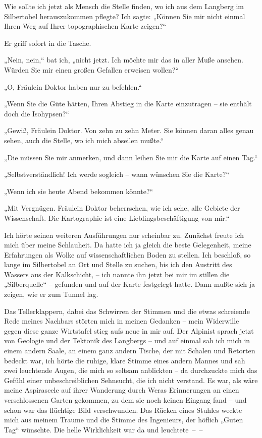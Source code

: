 Wie sollte ich jetzt als Mensch die Stelle finden, wo ich aus dem
Langberg im Silbertobel herauszukommen pflegte? Ich sagte: „Können
Sie mir nicht einmal Ihren Weg auf Ihrer topographischen Karte
zeigen?“

Er griff sofort in die Tasche.

„Nein, nein,“ bat ich, „nicht jetzt. Ich möchte mir das in aller
Muße ansehen. Würden Sie mir einen großen Gefallen erweisen
wollen?“

„O, Fräulein Doktor haben nur zu befehlen.“

„Wenn Sie die Güte hätten, Ihren Abstieg in die Karte einzutragen –
sie enthält doch die Isohypsen?“

„Gewiß, Fräulein Doktor. Von zehn zu zehn Meter. Sie können daran
alles genau sehen, auch die Stelle, wo ich mich abseilen mußte.“

„Die müssen Sie mir anmerken, und dann leihen Sie mir die Karte auf
einen Tag.“

„Selbstverständlich! Ich werde sogleich – wann wünschen Sie die
Karte?“

„Wenn ich sie heute Abend bekommen könnte?“

„Mit Vergnügen. Fräulein Doktor beherrschen, wie ich sehe, alle
Gebiete der Wissenschaft. Die Kartographie ist eine
Lieblingsbeschäftigung von mir.“

Ich hörte seinen weiteren Ausführungen nur scheinbar zu. Zunächst
freute ich mich über meine Schlauheit. Da hatte ich ja gleich die
beste Gelegenheit, meine Erfahrungen als Wolke auf
wissenschaftlichen Boden zu stellen. Ich beschloß, so lange im
Silbertobel an Ort und Stelle zu suchen, bis ich den Austritt des
Wassers aus der Kalkschicht, – ich nannte ihn jetzt bei mir im
stillen die „Silberquelle“ – gefunden und auf der Karte festgelegt
hatte. Dann mußte sich ja zeigen, wie er zum Tunnel lag.

Das Tellerklappern, dabei das Schwirren der Stimmen und die etwas
schreiende Rede meines Nachbars störten mich in meinen Gedanken –
mein Widerwille gegen diese ganze Wirtstafel stieg aufs neue in mir
auf. Der Alpinist sprach jetzt von Geologie und der Tektonik des
Langbergs – und auf einmal sah ich mich in einem andern Saale, an
einem ganz andern Tische, der mit Schalen und Retorten bedeckt war,
ich hörte die ruhige, klare Stimme eines andern Mannes und sah zwei
leuchtende Augen, die mich so seltsam anblickten – da durchzuckte
mich das Gefühl einer unbeschreiblichen Sehnsucht, die ich nicht
verstand. Es war, als wäre meine Aspiraseele auf ihrer Wanderung
durch Weras Erinnerungen an einen verschlossenen Garten gekommen,
zu dem sie noch keinen Eingang fand – und schon war das flüchtige
Bild verschwunden. Das Rücken eines Stuhles weckte mich aus meinem
Traume und die Stimme des Ingenieurs, der höflich „Guten Tag“
wünschte. Die helle Wirklichkeit war da und leuchtete~–~–

